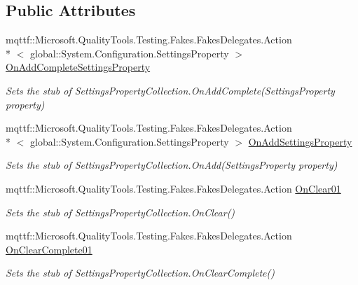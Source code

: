 \subsection*{Public Attributes}
\begin{DoxyCompactItemize}
\item 
mqttf\-::\-Microsoft.\-Quality\-Tools.\-Testing.\-Fakes.\-Fakes\-Delegates.\-Action\\*
$<$ global\-::\-System.\-Configuration.\-Settings\-Property $>$ \hyperlink{class_system_1_1_configuration_1_1_fakes_1_1_stub_settings_property_collection_aa60c781b047ad98a52b60218fc7d6e89}{On\-Add\-Complete\-Settings\-Property}
\begin{DoxyCompactList}\small\item\em Sets the stub of Settings\-Property\-Collection.\-On\-Add\-Complete(\-Settings\-Property property)\end{DoxyCompactList}\item 
mqttf\-::\-Microsoft.\-Quality\-Tools.\-Testing.\-Fakes.\-Fakes\-Delegates.\-Action\\*
$<$ global\-::\-System.\-Configuration.\-Settings\-Property $>$ \hyperlink{class_system_1_1_configuration_1_1_fakes_1_1_stub_settings_property_collection_a8b6a50a1d95d8d792ae6ddb1ef778930}{On\-Add\-Settings\-Property}
\begin{DoxyCompactList}\small\item\em Sets the stub of Settings\-Property\-Collection.\-On\-Add(\-Settings\-Property property)\end{DoxyCompactList}\item 
mqttf\-::\-Microsoft.\-Quality\-Tools.\-Testing.\-Fakes.\-Fakes\-Delegates.\-Action \hyperlink{class_system_1_1_configuration_1_1_fakes_1_1_stub_settings_property_collection_a6a81c70382ddad18c138856b6b02b166}{On\-Clear01}
\begin{DoxyCompactList}\small\item\em Sets the stub of Settings\-Property\-Collection.\-On\-Clear()\end{DoxyCompactList}\item 
mqttf\-::\-Microsoft.\-Quality\-Tools.\-Testing.\-Fakes.\-Fakes\-Delegates.\-Action \hyperlink{class_system_1_1_configuration_1_1_fakes_1_1_stub_settings_property_collection_ad59ba24a401c9a84b9b0183f347738bf}{On\-Clear\-Complete01}
\begin{DoxyCompactList}\small\item\em Sets the stub of Settings\-Property\-Collection.\-On\-Clear\-Complete()\end{DoxyCompactList}\item 

\end{DoxyCompactItemize}
